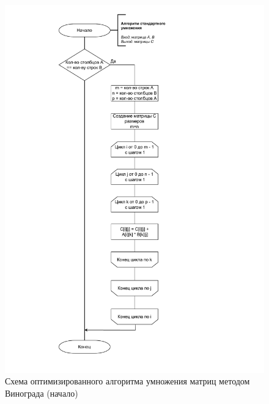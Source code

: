 \begin{figure}[h]
	\centering
	\includegraphics[height=0.9\textheight, page=4]{img/algorithms.pdf}
	\caption{Схема оптимизированного алгоритма умножения матриц методом Винограда (начало)}
	\label{fig:VinogradOpt1}
\end{figure}

\clearpage


